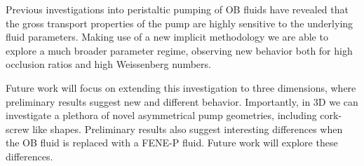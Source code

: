 
Previous investigations into peristaltic pumping of OB fluids have revealed that the gross transport properties of the pump are highly sensitive to the underlying fluid parameters. Making use of a new implicit methodology we are able to explore a much broader parameter regime, observing new behavior both for high occlusion ratios and high Weissenberg numbers.

Future work will focus on extending this investigation to three dimensions, where preliminary results suggest new and different behavior. Importantly, in 3D we can investigate a plethora of novel asymmetrical pump geometries, including cork-screw like shapes. Preliminary results also suggest interesting differences when the OB fluid is replaced with a FENE-P fluid. Future work will explore these differences.
